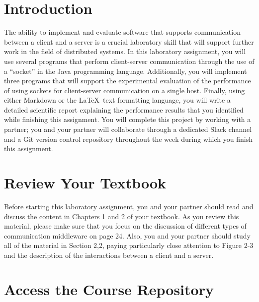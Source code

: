 


\usepackage[compact]{titlesec}



\section*{Introduction}

The ability to implement and evaluate software that supports communication between a client and a server is a crucial
laboratory skill that will support further work in the field of distributed systems. In this laboratory assignment, you
will use several programs that perform client-server communication through the use of a ``socket'' in the Java
programming language. Additionally, you will implement three programs that will support the experimental evaluation of
the performance of using sockets for client-server communication on a single host. Finally, using either Markdown or the
\LaTeX~text formatting language, you will write a detailed scientific report explaining the performance results that you
identified while finishing this assignment. You will complete this project by working with a partner; you and your
partner will collaborate through a dedicated Slack channel and a Git version control repository throughout the week
during which you finish this assignment.

\section*{Review Your Textbook}

Before starting this laboratory assignment, you and your partner should read and discuss the content in Chapters 1 and 2
of your textbook. As you review this material, please make sure that you focus on the discussion of different types of
communication middleware on page 24. Also, you and your partner should study all of the material in Section 2,2, paying
particularly close attention to Figure 2-3 and the description of the interactions between a client and a server.

\section*{Access the Course Repository}

